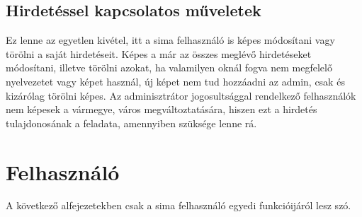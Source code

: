 \documentclass[]{thesis-ekf}
\theoremstyle{definition}
\theoremstyle{remark}
\begin{document}
	\subsection{Hirdetéssel kapcsolatos műveletek}
		Ez lenne az egyetlen kivétel, itt a sima felhasználó is képes módosítani vagy törölni a saját hirdetéseit. Képes a már az összes meglévő hirdetéseket módosítani, illetve törölni azokat, ha valamilyen oknál fogva nem megfelelő nyelvezetet vagy képet használ, új képet nem tud hozzáadni az admin, csak és kizárólag törölni képes. Az adminisztrátor jogosultsággal rendelkező felhasználók nem képesek a vármegye, város megváltoztatására, hiszen ezt a hirdetés tulajdonosának a feladata, amennyiben szüksége lenne rá.
	\section{Felhasználó}
		A következő alfejezetekben csak a sima felhasználó egyedi funkcióijáról lesz szó.
\end{document}
